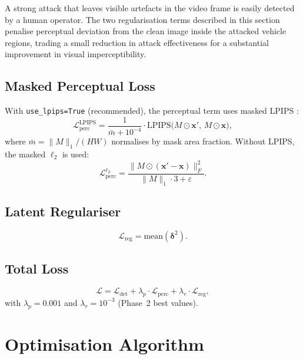 \documentclass[12pt,a4paper]{report}
\newcommand{\Ldet}{\mathcal{L}_{\text{det}}}
\newcommand{\Lperc}{\mathcal{L}_{\text{perc}}}
\newcommand{\Lreg}{\mathcal{L}_{\text{reg}}}
\begin{document}
A strong attack that leaves visible artefacts in the video frame is
easily detected by a human operator. The two regularisation terms
described in this section penalise perceptual deviation from the clean
image inside the attacked vehicle regions, trading a small reduction in
attack effectiveness for a substantial improvement in visual
imperceptibility.

\subsection{Masked Perceptual Loss}

With \texttt{use\_lpips=True} (recommended), the perceptual term uses masked LPIPS
\cite{zhang2018unreasonable}:
\begin{equation}
  \Lperc^{\text{LPIPS}} = \frac{1}{\bar{m} + 10^{-4}}
    \cdot \mathrm{LPIPS}\bigl(M \odot \mathbf{x}',\, M \odot \mathbf{x}\bigr),
  \label{eq:lperc_lpips}
\end{equation}
where $\bar{m} = \|M\|_1 / (HW)$ normalises by mask area fraction.
Without LPIPS, the masked $\ell_2$ is used:
\begin{equation}
  \Lperc^{\ell_2} = \frac{\|M \odot (\mathbf{x}' - \mathbf{x})\|_F^2}
    {\|M\|_1 \cdot 3 + \varepsilon}.
\end{equation}

\subsection{Latent Regulariser}

\begin{equation}
  \Lreg = \mathrm{mean}(\bm{\delta}^2).
  \label{eq:lreg}
\end{equation}

\subsection{Total Loss}
\begin{equation}
  \mathcal{L} = \Ldet + \lambda_p \cdot \Lperc + \lambda_r \cdot \Lreg,
  \label{eq:ltotal}
\end{equation}
with $\lambda_p = 0.001$ and $\lambda_r = 10^{-3}$ (Phase~2 best values).

\section{Optimisation Algorithm}
\label{sec:attack_loop}
\label{sec:optimisation}
\end{document}
